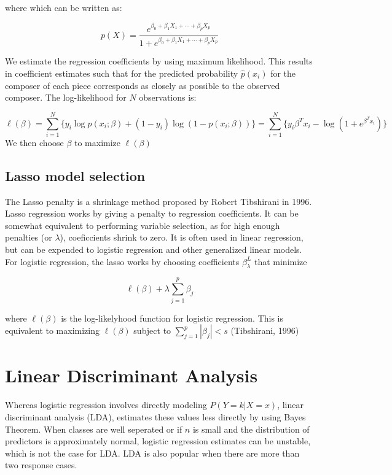 \documentclass[12pt,twoside]{reedthesis}
\theoremstyle{definition}
\theoremstyle{definition}
\theoremstyle{definition}
\theoremstyle{remark}
\begin{document}
where which can be written as:

\[ p(X) = \frac{e^{\beta_0 + \beta_1X_1 + \cdots + \beta_pX_p}}{1 +e^{\beta_0 + \beta_1X_1 + \cdots + \beta_pX_p} }\]

We estimate the regression coefficients by using maximum likelihood.
This results in coefficient estimates such that for the predicted
probability \(\hat{p}(x_i)\) for the composer of each piece corresponds
as closely as possible to the observed composer. The log-likelihood for
\(N\) observations is:

\[ \ell(\beta) = \sum_{i = 1}^N \big\{y_i\log p(x_i;\beta) + (1-y_i)\log(1-p(x_i;\beta))\big\} = \sum_{i = 1}^N \big\{y_i\beta^Tx_i - \log(1 + e^{\beta^Tx_i})\big\}\]
We then choose \(\beta\) to maximize \(\ell(\beta)\)

\subsection{Lasso model selection}\label{lasso-model-selection}

The Lasso penalty is a shrinkage method proposed by Robert Tibshirani in
1996. Lasso regression works by giving a penalty to regression
coefficients. It can be somewhat equivalent to performing variable
selection, as for high enough penalties (or \(\lambda\)), coeficcients
shrink to zero. It is often used in linear regression, but can be
expended to logistic regression and other generalized linear models. For
logistic regression, the lasso works by choosing coefficients
\(\beta_\lambda^L\) that minimize

\[ \ell(\beta) + \lambda \sum_{j = 1}^p \beta_j \]

where \(\ell(\beta)\) is the log-likelyhood function for logistic
regression. This is equivalent to maximizing \(\ell(\beta)\) subject to
\(\sum_{j=1}^p|\beta_j| < s\) (Tibshirani, 1996)

\section{Linear Discriminant
Analysis}\label{linear-discriminant-analysis}

Whereas logistic regression involves directly modeling
\(P(Y = k | X =x)\), linear discriminant analysis (LDA), estimates these
values less directly by using Bayes Theorem. When classes are well
seperated or if \(n\) is small and the distribution of predictors is
approximately normal, logistic regression estimates can be unstable,
which is not the case for LDA. LDA is also popular when there are more
than two response cases.
\end{document}
